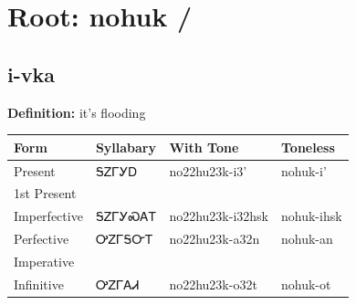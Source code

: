 \documentclass{article}%
\begin{document}
%
\normalsize%
\section*{Root: nohuk / }%
\subsection*{i-vka}%
\textbf{Definition: }%
it’s flooding%
\\[0.5em]%
\begin{tabular}{|l|l|l|l|}%
\hline%
\textbf{Form}&\textbf{Syllabary}&\textbf{With Tone}&\textbf{Toneless}\\%
\hline%
Present&ᎦᏃᎱᎩᎠ&no22hu23k{-}i3'&nohuk{-}i'\\%
1st Present&&&\\%
Imperfective&ᎦᏃᎱᎩᏍᎪᎢ&no22hu23k{-}i32hsk&nohuk{-}ihsk\\%
Perfective&ᎤᏃᎱᎦᏅᎢ&no22hu23k{-}a32n&nohuk{-}an\\%
Imperative&&&\\%
Infinitive&ᎤᏃᎱᎪᏗ&no22hu23k{-}o32t&nohuk{-}ot\\%
\hline%
\end{tabular}%
\\[1em]%
\end{document}
